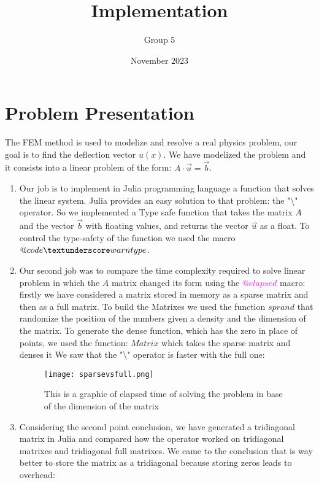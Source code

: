 \documentclass{article}
\title{Implementation}
\author{Group 5}
\date{November 2023}
\begin{document}
\maketitle

\section{Problem Presentation}

\noindent The FEM method is used to modelize and resolve a real physics problem, our goal is to find the deflection vector $u(x)$.
We have modelized the problem and it consists into a linear problem of the form: $A\cdot \Vec{u}=\Vec{b}$.
\begin{enumerate}
\item 
Our job is to implement in Julia programming language a function that solves the linear system.
Julia provides an easy solution to that problem: the "\textbackslash" operator. So we implemented a Type safe function that takes the matrix $A$ and the vector $\Vec{b}$ with floating values, and returns the vector $\Vec{u}$ as a float. To control the type-safety of the function we used the macro \textcolor{magenta}{$@code \textunderscore warntype$}.
\newpage
\item 
Our second job was to compare the time complexity required to solve linear problem in which the $A$ matrix changed its form using the \textcolor{magenta}{$@elapsed$} macro:
firstly we have considered a matrix stored in memory as a sparse matrix and then as a full matrix. To build the Matrixes we used the function $sprand$ that randomize the position of the numbers given a density and the dimension of the matrix. To generate the dense function, which has the zero in place of points, we used the function: $Matrix$ which takes the sparse matrix and denses it We saw that the "\textbackslash" operator is faster with the full one:
\begin{figure}[h]
    \centering
    \texttt{[image: sparsevsfull.png]}
    \caption{This is a graphic of elapsed time of solving the problem in base of the dimension of the matrix}
    \label{fig:enter-label}
\end{figure}

\item {
Considering the second point conclusion, we have generated a tridiagonal matrix in Julia and compared how the operator worked on tridiagonal matrixes and tridiagonal full matrixes. We came to the conclusion that is way better to store the matrix as a tridiagonal because storing zeros leads to overhead:

}
\end{enumerate}
\end{document}
